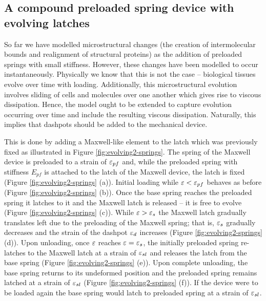 \documentclass{article}
\begin{document}
\subsection{A compound preloaded spring device with evolving latches}

So far we have modelled microstructural changes (the creation of intermolecular bounds and realignment of structural proteins) as the addition of preloaded springs with small stiffness. However, these changes have been modelled to occur instantaneously. Physically we know that this is not the case -- biological tissues evolve over time with loading. Additionally, this microstructural evolution involves sliding of cells and molecules over one another which gives rise to viscous dissipation. Hence, the model ought to be extended to capture evolution occurring over time and include the resulting viscous dissipation. Naturally, this implies that dashpots should be added to the mechanical device. 

This is done by adding a Maxwell-like element to the latch which was previously fixed as illustrated in Figure \ref{fig:evolving2-springs}. 
The spring of the Maxwell device is preloaded to a strain of $\varepsilon_{pf}$ and, while the preloaded spring with stiffness $E_{pf}$ is attached to the latch of the Maxwell device, the latch is fixed (Figure \ref{fig:evolving2-springs} (a)). Initial loading while $\varepsilon<\varepsilon_{pf}$ behaves as before (Figure \ref{fig:evolving2-springs} (b)). Once the base spring reaches the preloaded spring it latches to it and the Maxwell latch is released -- it is free to evolve (Figure \ref{fig:evolving2-springs} (c)). While $\varepsilon>\varepsilon_{s}$ the Maxwell latch gradually translates left due to the preloading of the Maxwell spring; that is, $\varepsilon_{s}$ gradually decreases and the strain of the dashpot $\varepsilon_{d}$ increases (Figure \ref{fig:evolving2-springs} (d)). Upon unloading, once $\varepsilon$ reaches $\varepsilon=\varepsilon_{s}$, the initially preloaded spring re-latches to the Maxwell latch at a strain of $\varepsilon_{sl}$ and releases the latch from the base spring (Figure \ref{fig:evolving2-springs} (e)). Upon complete unloading, the base spring returns to its undeformed position and the preloaded spring remains latched at a strain of $\varepsilon_{sl}$ (Figure \ref{fig:evolving2-springs} (f)). If the device were to be loaded again the base spring would latch to preloaded spring at a strain of $\varepsilon_{sl}$.
\end{document}
